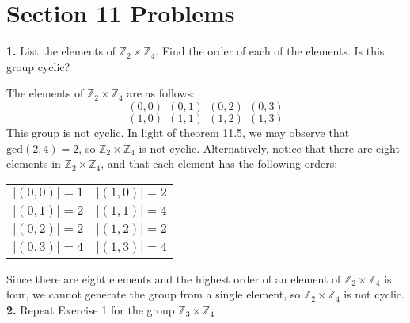 \documentclass{article}
\begin{document}
\section*{Section 11 Problems}

\textbf{1.} List the elements of $\mathbb{Z}_2 \times \mathbb{Z}_4$. Find the order of each of the elements. Is this group cyclic?

The elements of $\mathbb{Z}_2 \times \mathbb{Z}_4$ are as follows:
\[(0,0) \:\: (0,1) \:\: (0,2) \:\: (0,3)\]
\[(1,0) \:\: (1,1) \:\: (1,2) \:\: (1,3)\]
This group is not cyclic. In light of theorem 11.5, we may observe that $\text{gcd}(2,4) = 2$, so $\mathbb{Z}_2 \times \mathbb{Z}_4$ is not cyclic. Alternatively, notice that there are eight elements in $\mathbb{Z}_2 \times \mathbb{Z}_4$, and that each element has the following orders:
\newline
\begin{center}
    \begin{tabular}{c|c}
        $|(0,0)| = 1$ & $|(1,0)| = 2$ \\
        $|(0,1)| = 2$ & $|(1,1)| = 4$ \\
        $|(0,2)| = 2$ & $|(1,2)| = 2$ \\
        $|(0,3)| = 4$ & $|(1,3)| = 4$ \\
    \end{tabular}
\end{center}
Since there are eight elements and the highest order of an element of $\mathbb{Z}_2 \times \mathbb{Z}_4$ is four, we cannot generate the group from a single element, so $\mathbb{Z}_2 \times \mathbb{Z}_4$ is not cyclic.
\newline\newline
\textbf{2.} Repeat Exercise 1 for the group $\mathbb{Z}_3 \times \mathbb{Z}_4$
\newline
\end{document}
